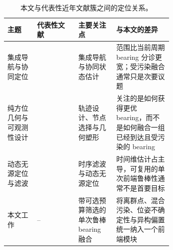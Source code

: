 \begin{table}[!htbp]
\centering
\caption{本文与代表性近年文献簇之间的定位关系。}
\label{tab:litposition}
\footnotesize
\setlength{\tabcolsep}{4pt}
\renewcommand{\arraystretch}{1.02}
\begin{tabularx}{\linewidth}{>{\RaggedRight\arraybackslash}p{0.18\linewidth}>{\RaggedRight\arraybackslash}p{0.25\linewidth}>{\RaggedRight\arraybackslash}p{0.23\linewidth}>{\RaggedRight\arraybackslash}X}
\toprule
主题 & 代表性文献 & 主要关注点 & 与本文的差异 \\
\midrule
集成导航与协同定位 & \cite{yang2020tightly,dai2022uav,yang2024distributed,qian2025cooperative,li2025tcdrl} & 集成导航与协同状态估计 & 范围比当前周期 bearing 分诊更宽；受污染融合通常只是次要议题 \\
纯方位几何与可观测性设计 & \cite{kang2024aoa,zou2024revisit,chen2025variable,dogancay2024bayesian,xing2025node} & 轨迹设计、节点选择与几何塑形 & 关注的是如何获得更优 bearing，而不是如何融合一组已经到达且受污染的 bearing \\
动态无源定位与滤波 & \cite{chen2025error,luo2025dynamicbearing,yin2025dual,dou2025moving,wu2026bearing} & 时序滤波与动态无源定位 & 时间维估计占主导，可复用的单次前端鲁棒性通常不是首要目标 \\
本文工作 & -- & 带可选预算筛选的单次鲁棒 bearing 融合 & 将离群点、混合污染、位姿不确定性与异构偏置统一纳入一个前端模块 \\
\bottomrule
\end{tabularx}
\end{table}
